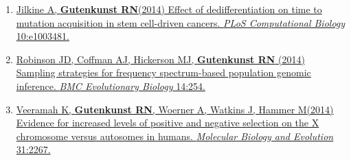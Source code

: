 \documentclass[11pt]{article}
\newcommand{\dadi}{dadi\xspace}
\begin{document}
\begin{enumerate}
\item \href{http://doi.org/10.1371/journal.pcbi.1003481}{Jilkine A\trainee, \textbf{Gutenkunst RN}\corresponding (2014) Effect of dedifferentiation on time to mutation acquisition in stem cell-driven cancers. \emph{PLoS Computational Biology} 10:e1003481.}


\item \href{http://doi.org/10.1186/s12862-014-0254-4}{Robinson JD\corresponding, Coffman AJ\trainee, Hickerson MJ, \textbf{Gutenkunst RN} (2014) Sampling strategies for frequency spectrum-based population genomic inference. \emph{BMC Evolutionary Biology} 14:254.}

\item  \href{http://doi.org/10.1093/molbev/msu166}{Veeramah K, \textbf{Gutenkunst RN}, Woerner A, Watkins J, Hammer M\corresponding (2014) Evidence for increased levels of positive and negative selection on the X chromosome versus autosomes in humans. \emph{Molecular Biology and Evolution} 31:2267.}



\end{enumerate}
\end{document}
